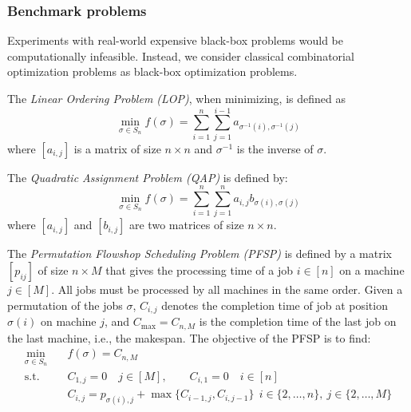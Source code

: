 \documentclass[runningheads]{llncs}
\begin{document}
\subsubsection{Benchmark problems}
%
Experiments with real-world expensive black-box problems would be computationally infeasible. Instead, we consider classical combinatorial optimization problems as black-box optimization problems.

The \emph{Linear Ordering Problem (LOP)}, when minimizing, is defined as
\begin{equation}\label{eq:lop}
  \min_{\sigma \in S_n} f(\sigma) = \sum_{i=1}^{n} \sum_{j=1}^{i-1}  a_{\sigma^{-1}(i), \sigma^{-1}(j)}
\end{equation}
where $[a_{i,j}]$ is a matrix of size $n \times n$ and $\sigma^{-1}$ is the inverse of $\sigma$.


The \emph{Quadratic Assignment Problem (QAP)} is defined by:
\begin{equation}\label{eq:qap}
  \min_{\sigma \in S_n} f(\sigma) = \sum_{i=1}^n \sum_{j=1}^n a_{i,j} b_{\sigma(i), \sigma(j)}
\end{equation}
%
where $[a_{i,j}]$ and $[b_{i,j}]$ are two matrices of size $n \times n$.

The \emph{Permutation Flowshop Scheduling Problem (PFSP)} is defined by a matrix $[p_{ij}]$ of size $n \times M$ that gives the processing time of a job $i \in [n]$ on a machine $j \in [M]$. All jobs must be processed by all machines in the same order. Given a permutation of the jobs $\sigma$, $C_{i,j}$ denotes the completion time of job at position $\sigma(i)$ on machine $j$, and $C_{\max} = C_{n,M}$  is the completion time of the last job on the last machine, i.e., the makespan. The objective of the PFSP is to find:
\begin{equation}\label{eq:pfsp}
  \begin{split}
    \min_{\sigma \in S_n}\quad& f(\sigma) = C_{n,M}\\
    \text{s.t.}\quad & C_{1,j} = 0 \quad j\in [M], \qquad C_{i,1} = 0\quad i \in [n]\\
    &C_{i,j} = p_{\sigma(i),j} + \max\{C_{i-1, j}, C_{i, j-1}\}  \ \  i \in \{2,\dotsc,n\},\ j \in\{2,\dotsc, M\}\\
\end{split}
\end{equation}
\end{document}

